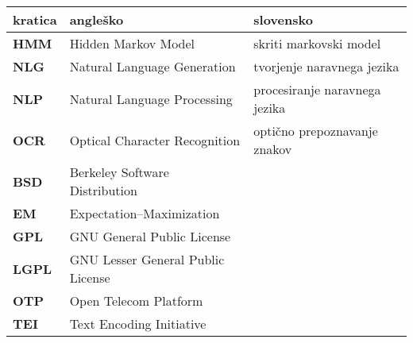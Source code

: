 \begin{tabular}{l|l|l}
  {\bf kratica} & {\bf angleško} & {\bf slovensko} \\
  \hline
  {\bf HMM}  & Hidden Markov Model & skriti markovski model \\
  {\bf NLG}  & Natural Language Generation & tvorjenje naravnega jezika \\
  {\bf NLP}  & Natural Language Processing & procesiranje naravnega jezika \\
  {\bf OCR}  & Optical Character Recognition & optično prepoznavanje znakov \\
  \hline
  {\bf BSD}  & Berkeley Software Distribution \\
  {\bf EM}   & Expectation–Maximization \\
  {\bf GPL}  & GNU General Public License \\
  {\bf LGPL} & GNU Lesser General Public License \\
  {\bf OTP}  & Open Telecom Platform \\
  {\bf TEI}  & Text Encoding Initiative \\
\end{tabular}
